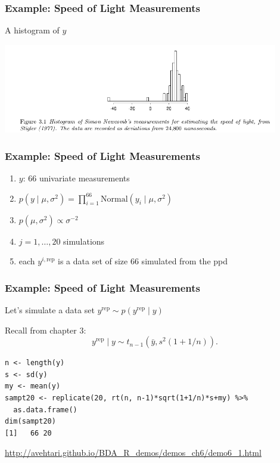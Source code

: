 \documentclass{beamer}
\begin{document}
\begin{frame}
\frametitle{Example: Speed of Light Measurements}

A histogram of $y$
\begin{center}
\includegraphics[width=120mm]{speed_light_data.png}
\end{center}

\end{frame}


\begin{frame}
\frametitle{Example: Speed of Light Measurements}

\begin{enumerate}
\item $y$: $66$ univariate measurements 
\item $p(y \mid \mu, \sigma^2) = \prod_{i=1}^{66}\text{Normal}(y_i \mid \mu, \sigma^2)$
\item $p(\mu, \sigma^2) \propto \sigma^{-2}$
\item $j = 1, \ldots, 20$ simulations
\item each $y^{i, \text{rep}}$ is a data set of size $66$ simulated from the ppd
\end{enumerate}


\end{frame}




\begin{frame}[fragile]
\frametitle{Example: Speed of Light Measurements}

Let's simulate a data set $y^{\text{rep}} \sim p(y^{\text{rep}} \mid y)$
\newline

Recall from chapter 3:
\[
y^{\text{rep}} \mid y \sim t_{n-1}(\bar{y}, s^2(1 + 1/n)).
\]

\begin{verbatim}
n <- length(y)
s <- sd(y)
my <- mean(y)
sampt20 <- replicate(20, rt(n, n-1)*sqrt(1+1/n)*s+my) %>%
  as.data.frame()
dim(sampt20)
[1]   66 20
\end{verbatim}
\url{http://avehtari.github.io/BDA_R_demos/demos_ch6/demo6_1.html}
\end{frame}
\end{document}
